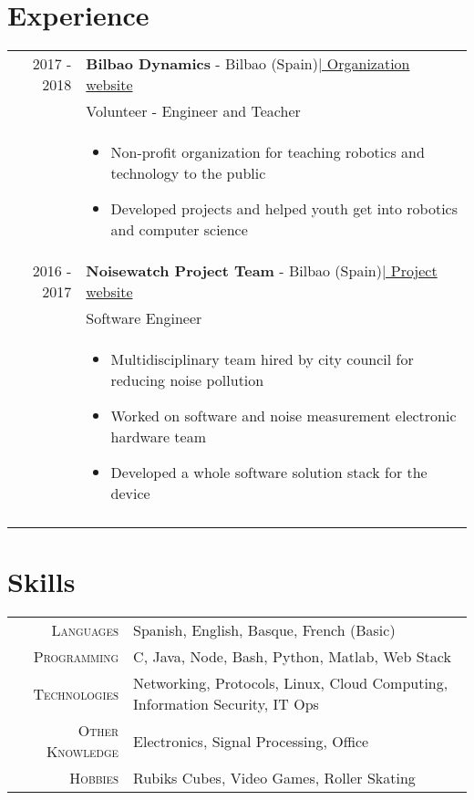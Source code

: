 \documentclass[a4paper,10pt]{article}
\begin{document}
\section{Experience}
\begin{tabular}{rp{13.6cm}}

 \textsc{2017 - 2018}& \textbf{Bilbao Dynamics} - Bilbao (Spain)\href{https://bilbaodynamics.com/}{\hfill | \footnotesize Organization website}\\
 & Volunteer - Engineer and Teacher \\ 
 & \footnotesize{ \begin{itemize}[noitemsep,topsep=-10pt]
 \vspace{-0.1in}
 \item Non-profit organization for teaching robotics and technology to the public
 \item Developed projects and helped youth get into robotics and computer science 

 \end{itemize}} \\

 \textsc{2016 - 2017}& \textbf{Noisewatch Project Team} - Bilbao (Spain)\href{http://noise.watch}{\hfill | \footnotesize Project website}\\
 & Software Engineer \\
 & \footnotesize{ \begin{itemize}[noitemsep,topsep=40pt,nolistsep]
 \vspace{-0.1in}
 \item Multidisciplinary team hired by city council for reducing noise pollution
 \item Worked on software and noise measurement electronic hardware team
 \item Developed a whole software solution stack for the device  
 \end{itemize}} \\&\\

 
\end{tabular}

 \vspace{-.3in}

\section{Skills}
\begin{tabular}{r|l}
\textsc{Languages} & Spanish, English, Basque, French (Basic) \\
\textsc{Programming} & C, Java, Node, Bash, Python, Matlab, Web Stack \\
\textsc{Technologies} & Networking, Protocols, Linux, Cloud Computing, Information Security, IT Ops \\
\textsc{Other Knowledge} & Electronics, Signal Processing, Office \\
\textsc{Hobbies} & Rubiks Cubes, Video Games, Roller Skating
\end{tabular}
\end{document}

